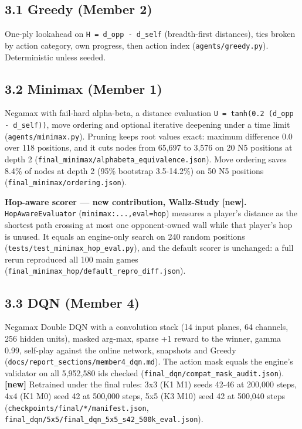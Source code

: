 \documentclass[11pt]{article}
\begin{document}
\subsection{3.1 Greedy (Member 2)}

One-ply lookahead on \texttt{H = d\_opp - d\_self} (breadth-first distances), ties broken by action
category, own progress, then action index (\texttt{agents/greedy.py}). Deterministic unless seeded.

\subsection{3.2 Minimax (Member 1)}

Negamax with fail-hard alpha-beta, a distance evaluation \texttt{U = tanh(0.2 (d\_opp - d\_self))},
move ordering and optional iterative deepening under a time limit (\texttt{agents/minimax.py}).
Pruning keeps root values exact: maximum difference 0.0 over 118 positions, and it cuts nodes
from 65,697 to 3,576 on 20 N5 positions at depth 2 (\texttt{final\_minimax/alphabeta\_equivalence.json}).
Move ordering saves 8.4\% of nodes at depth 2 (95\% bootstrap 3.5-14.2\%) on 50 N5 positions
(\texttt{final\_minimax/ordering.json}).

\textbf{Hop-aware scorer — new contribution, Wallz-Study [new].} \texttt{HopAwareEvaluator}
(\texttt{minimax:...,eval=hop}) measures a player's distance as the shortest path crossing at most one
opponent-owned wall while that player's hop is unused. It equals an engine-only search on 240
random positions (\texttt{tests/test\_minimax\_hop\_eval.py}), and the default scorer is unchanged: a full
rerun reproduced all 100 main games (\texttt{final\_minimax\_hop/default\_repro\_diff.json}).

\subsection{3.3 DQN (Member 4)}

Negamax Double DQN with a convolution stack (14 input planes, 64 channels, 256 hidden units),
masked arg-max, sparse +1 reward to the winner, gamma 0.99, self-play against the online
network, snapshots and Greedy (\texttt{docs/report\_sections/member4\_dqn.md}). The action mask equals
the engine's validator on all 5,952,580 ids checked (\texttt{final\_dqn/compat\_mask\_audit.json}).
\textbf{[new]} Retrained under the final rules: 3x3 (K1 M1) seeds 42-46 at 200,000 steps, 4x4 (K1 M0)
seed 42 at 500,000 steps, 5x5 (K3 M10) seed 42 at 500,040 steps (\texttt{checkpoints/final/*/manifest.json},
\texttt{final\_dqn/5x5/final\_dqn\_5x5\_s42\_500k\_eval.json}).
\end{document}
